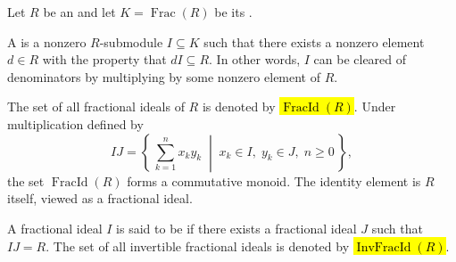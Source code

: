 \begin{definition} \label{definition:fractional_ideal_of_an_integral_domain}
Let $R$ be an  and let $K = \operatorname{Frac}(R)$ be its .

A  is a nonzero $R$-submodule $I \subseteq K$ such that there exists a nonzero element $d \in R$ with the property that $dI \subseteq R$. In other words, $I$ can be cleared of denominators by multiplying by some nonzero element of $R$.

The set of all fractional ideals of $R$ is denoted by \hl{$\operatorname{FracId}(R)$}. Under multiplication defined by
$$IJ = \left\{\, \sum_{k=1}^n x_k y_k \;\middle|\; x_k \in I,\; y_k \in J,\; n \geq 0 \,\right\},$$
the set $\operatorname{FracId}(R)$ forms a commutative monoid. The identity element is $R$ itself, viewed as a fractional ideal.

A fractional ideal $I$ is said to be  if there exists a fractional ideal $J$ such that $IJ = R$. The set of all invertible fractional ideals is denoted by \hl{$\operatorname{InvFracId}(R)$}.
\end{definition}
